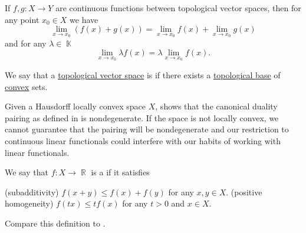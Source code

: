 \begin{corollary}\label{thm:linearity_of_function_limits}
  If \( f, g: X \to Y \) are continuous functions between topological vector spaces, then for any point \( x_0 \in X \) we have
  \begin{equation*}
    \lim_{x \to x_0} (f(x) + g(x)) = \lim_{x \to x_0} f(x) + \lim_{x \to x_0} g(x)
  \end{equation*}
  and for any \( \lambda \in \BbbK \)
  \begin{equation*}
    \lim_{x \to x_0} \lambda f(x) = \lambda \lim_{x \to x_0} f(x).
  \end{equation*}
\end{corollary}

\begin{definition}\label{def:locally_convex_space}\mcite\cite[1.8]{Rudin1991}
  We say that a \hyperref[def:topological_vector_space]{topological vector space} is  if there exists a \hyperref[def:topological_base]{topological base} of \hyperref[def:convex_set]{convex} sets.
\end{definition}

\begin{remark}\label{def:locally_convex_duality_pairing}
  Given a Hausdorff locally convex space \( X \),  shows that the canonical duality pairing as defined in  is nondegenerate. If the space is not locally convex, we cannot guarantee that the pairing will be nondegenerate and our restriction to continuous linear functionals could interfere with our habits of working with linear functionals.
\end{remark}

\begin{definition}\label{def:sublinear_functional}
  We say that \( f: X \to \BbbR \) is a  if it satisfies
  \begin{defenum}
    (subadditivity) \( f(x + y) \leq f(x) + f(y) \) for any \( x, y \in X \).
    (positive homogeneity) \( f(tx) \leq t f(x) \) for any \( t > 0 \) and \( x \in X \).
  \end{defenum}

  Compare this definition to .
\end{definition}
